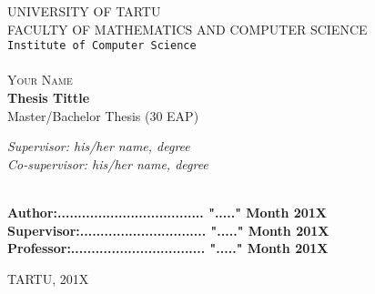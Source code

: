\begin{titlepage}

\begin{center}



\textsc{UNIVERSITY OF TARTU}\\

\textsc{FACULTY OF MATHEMATICS AND COMPUTER SCIENCE}\\

\texttt{Institute of Computer Science}\\

\hbox{}\\[6cm]


\textsc{ \large Your Name}\\[0.5cm]
{ \Huge \bfseries Thesis Tittle}\\[0.5cm]
{\large Master/Bachelor Thesis (30 EAP)}\\[3cm]



\begin{minipage}{0.8\textwidth}
\begin{flushright} \large
\emph{Supervisor: his/her name, degree}  \\	  %
\emph{Co-supervisor: his/her name, degree}  %
\end{flushright}
\end{minipage}

\textbf{}\\[1.0cm]

\textbf{Author:.................................... "....." Month   201X}\\[0.5cm]

\textbf{Supervisor:............................... "....." Month   201X}\\[0.5cm]

\textbf{Professor:................................. "....." Month   201X}\\[0.5cm]        

\vfill

{\large TARTU, 201X}

\end{center}

\end{titlepage}
